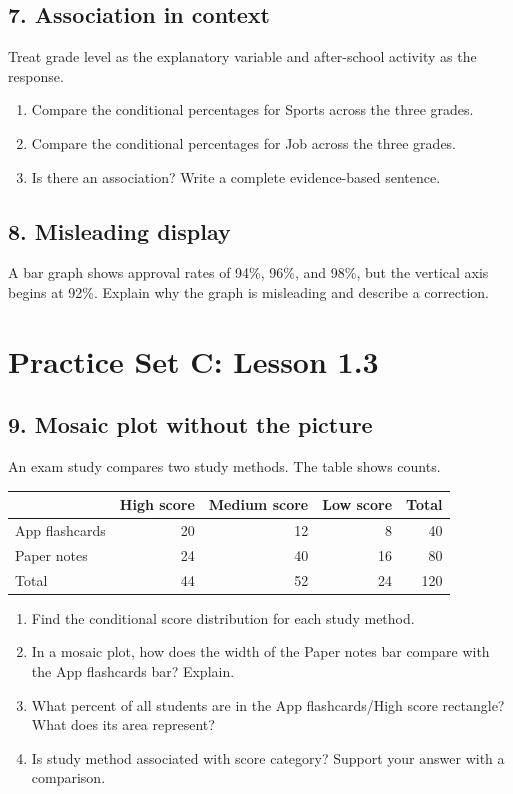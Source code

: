 \documentclass[11pt]{article}
\newcommand{\workline}{\vspace{0.33in}\hrulefill}
\begin{document}
\subsection*{7. Association in context}
Treat grade level as the explanatory variable and after-school activity as the response.
\begin{enumerate}[label=\alph*.]
  \item Compare the conditional percentages for Sports across the three grades.\\[0.28in]
  \item Compare the conditional percentages for Job across the three grades.\\[0.28in]
  \item Is there an association? Write a complete evidence-based sentence.\\[0.35in]
\end{enumerate}

\subsection*{8. Misleading display}
A bar graph shows approval rates of 94\%, 96\%, and 98\%, but the vertical axis begins at 92\%. Explain why the graph is misleading and describe a correction.
\workline

\Needspace{2.0in}
\section{Practice Set C: Lesson 1.3}

\subsection*{9. Mosaic plot without the picture}
An exam study compares two study methods. The table shows counts.
\begin{center}
\begin{tabular}{l|rrr|r}
 & High score & Medium score & Low score & Total\\ \hline
App flashcards & 20 & 12 & 8 & 40\\
Paper notes & 24 & 40 & 16 & 80\\ \hline
Total & 44 & 52 & 24 & 120
\end{tabular}
\end{center}
\begin{enumerate}[label=\alph*.]
  \item Find the conditional score distribution for each study method.\\[0.45in]
  \item In a mosaic plot, how does the width of the Paper notes bar compare with the App flashcards bar? Explain.\\[0.3in]
  \item What percent of all students are in the App flashcards/High score rectangle? What does its area represent?\\[0.32in]
  \item Is study method associated with score category? Support your answer with a comparison.\\[0.35in]
\end{enumerate}
\end{document}
